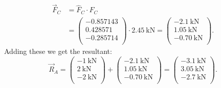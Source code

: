 \begin{derivation}
\begin{align*}
  \\
  \Vec{F}_C &= \hat{F}_C \cdot F_C\\
  &= \begin{pmatrix}
    - \num{0.857143} \\
  \num{0.428571} \\
  -\num{0.285714} \\
  \end{pmatrix} \cdot \qty{2.45}{\kN} = \begin{pmatrix}
    - \qty{2,1}{\kN} \\
  \qty{1,05}{\kN} \\
  - \qty{0,70}{\kN} \\
  \end{pmatrix}
.\end{align*}
Adding these we get the resultant:
\begin{equation*}
  \Vec{R}_A = \begin{pmatrix}
    - \qty{1}{\kN} \\
  \qty{2}{\kN} \\
  - \qty{2}{\kN} \\
  \end{pmatrix} + \begin{pmatrix}
    - \qty{2.1}{\kN} \\
  \qty{1.05}{\kN} \\
  - \qty{0.70}{\kN} \\
  \end{pmatrix} = \begin{pmatrix}
    -\qty{3,1}{\kN} \\
  \qty{3,05}{\kN} \\
  - \qty{2,7}{\kN} \\
  \end{pmatrix}
.\end{equation*}
\end{derivation}

